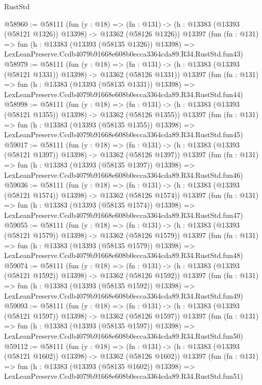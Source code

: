 \begin{lexlean}{RustStd}
\begin{coremodule}
@58960 := @58111
    (fun (y : @18) =>
    (fn : @131) -> (h : @13383 (@13393 (@58121 @1326)) @13398) -> @13362 (@58126 @1326))
    @13397
    (fun (fn : @131) =>
    fun (h : @13383 (@13393 (@58135 @1326)) @13398) =>
    LexLeanPreserve.Ccdb4079b91668e608b0ecca3364cda89.R34.RustStd.fun43)
@58979 := @58111
    (fun (y : @18) =>
    (fn : @131) -> (h : @13383 (@13393 (@58121 @1331)) @13398) -> @13362 (@58126 @1331))
    @13397
    (fun (fn : @131) =>
    fun (h : @13383 (@13393 (@58135 @1331)) @13398) =>
    LexLeanPreserve.Ccdb4079b91668e608b0ecca3364cda89.R34.RustStd.fun44)
@58998 := @58111
    (fun (y : @18) =>
    (fn : @131) -> (h : @13383 (@13393 (@58121 @1355)) @13398) -> @13362 (@58126 @1355))
    @13397
    (fun (fn : @131) =>
    fun (h : @13383 (@13393 (@58135 @1355)) @13398) =>
    LexLeanPreserve.Ccdb4079b91668e608b0ecca3364cda89.R34.RustStd.fun45)
@59017 := @58111
    (fun (y : @18) =>
    (fn : @131) -> (h : @13383 (@13393 (@58121 @1397)) @13398) -> @13362 (@58126 @1397))
    @13397
    (fun (fn : @131) =>
    fun (h : @13383 (@13393 (@58135 @1397)) @13398) =>
    LexLeanPreserve.Ccdb4079b91668e608b0ecca3364cda89.R34.RustStd.fun46)
@59036 := @58111
    (fun (y : @18) =>
    (fn : @131) -> (h : @13383 (@13393 (@58121 @1574)) @13398) -> @13362 (@58126 @1574))
    @13397
    (fun (fn : @131) =>
    fun (h : @13383 (@13393 (@58135 @1574)) @13398) =>
    LexLeanPreserve.Ccdb4079b91668e608b0ecca3364cda89.R34.RustStd.fun47)
@59055 := @58111
    (fun (y : @18) =>
    (fn : @131) -> (h : @13383 (@13393 (@58121 @1579)) @13398) -> @13362 (@58126 @1579))
    @13397
    (fun (fn : @131) =>
    fun (h : @13383 (@13393 (@58135 @1579)) @13398) =>
    LexLeanPreserve.Ccdb4079b91668e608b0ecca3364cda89.R34.RustStd.fun48)
@59074 := @58111
    (fun (y : @18) =>
    (fn : @131) -> (h : @13383 (@13393 (@58121 @1592)) @13398) -> @13362 (@58126 @1592))
    @13397
    (fun (fn : @131) =>
    fun (h : @13383 (@13393 (@58135 @1592)) @13398) =>
    LexLeanPreserve.Ccdb4079b91668e608b0ecca3364cda89.R34.RustStd.fun49)
@59093 := @58111
    (fun (y : @18) =>
    (fn : @131) -> (h : @13383 (@13393 (@58121 @1597)) @13398) -> @13362 (@58126 @1597))
    @13397
    (fun (fn : @131) =>
    fun (h : @13383 (@13393 (@58135 @1597)) @13398) =>
    LexLeanPreserve.Ccdb4079b91668e608b0ecca3364cda89.R34.RustStd.fun50)
@59112 := @58111
    (fun (y : @18) =>
    (fn : @131) -> (h : @13383 (@13393 (@58121 @1602)) @13398) -> @13362 (@58126 @1602))
    @13397
    (fun (fn : @131) =>
    fun (h : @13383 (@13393 (@58135 @1602)) @13398) =>
    LexLeanPreserve.Ccdb4079b91668e608b0ecca3364cda89.R34.RustStd.fun51)

\end{coremodule}
\end{lexlean}
